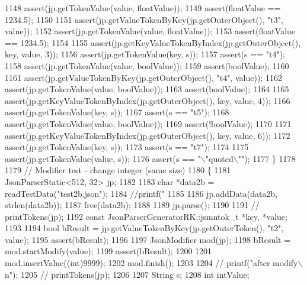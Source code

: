 \begin{DoxyCode}
{{{{{{{{{{{{{{{1148         assert(jp.getTokenValue(value, floatValue));
1149         assert(floatValue == 1234.5);
1150 
1151         assert(jp.getValueTokenByKey(jp.getOuterObject(), \textcolor{stringliteral}{"t3"}, value));
1152         assert(jp.getTokenValue(value, floatValue));
1153         assert(floatValue == 1234.5);
1154 
1155         assert(jp.getKeyValueTokenByIndex(jp.getOuterObject(), key, value, 3));
1156         assert(jp.getTokenValue(key, s));
1157         assert(s == \textcolor{stringliteral}{"t4"});
1158         assert(jp.getTokenValue(value, boolValue));
1159         assert(boolValue);
1160 
1161         assert(jp.getValueTokenByKey(jp.getOuterObject(), \textcolor{stringliteral}{"t4"}, value));
1162         assert(jp.getTokenValue(value, boolValue));
1163         assert(boolValue);
1164 
1165         assert(jp.getKeyValueTokenByIndex(jp.getOuterObject(), key, value, 4));
1166         assert(jp.getTokenValue(key, s));
1167         assert(s == \textcolor{stringliteral}{"t5"});
1168         assert(jp.getTokenValue(value, boolValue));
1169         assert(!boolValue);
1170 
1171         assert(jp.getKeyValueTokenByIndex(jp.getOuterObject(), key, value, 6));
1172         assert(jp.getTokenValue(key, s));
1173         assert(s == \textcolor{stringliteral}{"t7"});
1174 
1175         assert(jp.getTokenValue(value, s));
1176         assert(s == \textcolor{stringliteral}{"\(\backslash\)"quoted\(\backslash\)""});
1177     \}
1178 
1179     \textcolor{comment}{// Modifier test - change integer (same size)}
1180     \{
1181         JsonParserStatic<512, 32> jp;
1182 
1183         \textcolor{keywordtype}{char} *data2b = readTestData(\textcolor{stringliteral}{"test2b.json"});
1184         \textcolor{comment}{//printf("%
1185 
1186         jp.addData(data2b, strlen(data2b));
1187         free(data2b);
1188 
1189         jp.parse();
1190 
1191         \textcolor{comment}{// printTokens(jp);}
1192         \textcolor{keyword}{const} JsonParserGeneratorRK::jsmntok_t *key, *value;
1193 
1194         \textcolor{keywordtype}{bool} bResult = jp.getValueTokenByKey(jp.getOuterToken(), \textcolor{stringliteral}{"t2"}, value);
1195         assert(bResult);
1196 
1197         JsonModifier mod(jp);
1198         bResult = mod.startModify(value);
1199         assert(bResult);
1200 
1201         mod.insertValue((\textcolor{keywordtype}{int})9999);
1202         mod.finish();
1203 
1204         \textcolor{comment}{// printf("after modify\(\backslash\)n");}
1205         \textcolor{comment}{// printTokens(jp);}
1206 
1207         String s;
1208         \textcolor{keywordtype}{int} intValue;
}}}}}}}}}}}}}}}}
\end{DoxyCode}
